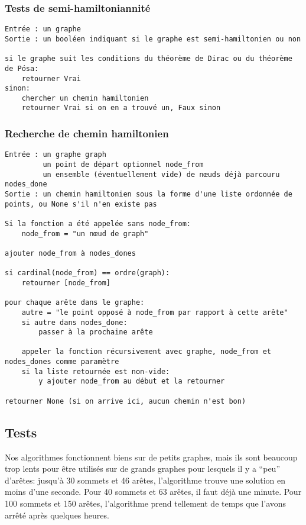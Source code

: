 \documentclass{scrartcl}
\begin{document}
    \subsubsection{Tests de semi-hamiltoniannité}
      \begin{lstlisting}
Entrée : un graphe
Sortie : un booléen indiquant si le graphe est semi-hamiltonien ou non

si le graphe suit les conditions du théorème de Dirac ou du théorème de Pósa:
    retourner Vrai
sinon:
    chercher un chemin hamiltonien
    retourner Vrai si on en a trouvé un, Faux sinon
      \end{lstlisting}

    \subsubsection{Recherche de chemin hamiltonien}
      \begin{lstlisting}
Entrée : un graphe graph
         un point de départ optionnel node_from
         un ensemble (éventuellement vide) de nœuds déjà parcouru nodes_done
Sortie : un chemin hamiltonien sous la forme d'une liste ordonnée de points, ou None s'il n'en existe pas

Si la fonction a été appelée sans node_from:
    node_from = "un nœud de graph"

ajouter node_from à nodes_dones

si cardinal(node_from) == ordre(graph):
    retourner [node_from]

pour chaque arête dans le graphe:
    autre = "le point opposé à node_from par rapport à cette arête"
    si autre dans nodes_done:
        passer à la prochaine arête

    appeler la fonction récursivement avec graphe, node_from et nodes_dones comme paramètre
    si la liste retournée est non-vide:
        y ajouter node_from au début et la retourner

retourner None (si on arrive ici, aucun chemin n'est bon)
      \end{lstlisting}

  \subsection{Tests}
    Nos algorithmes fonctionnent biens sur de petits graphes, mais ils sont
    beaucoup trop lents pour être utilisés sur de grands graphes pour lesquels
    il y a ``peu'' d'arêtes: jusqu'à 30 sommets et 46 arêtes, l'algorithme
    trouve une solution en moins d'une seconde. Pour 40 sommets et 63 arêtes,
    il faut déjà une minute. Pour 100 sommets et 150 arêtes, l'algorithme
    prend tellement de temps que l'avons arrêté après quelques heures.
\end{document}
